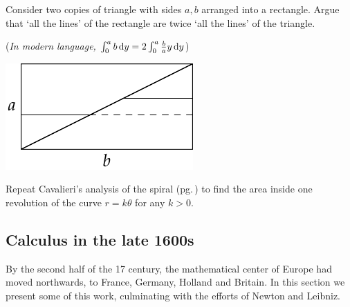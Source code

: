 \begin{exercises}{}{}
\begin{enumerate}
		\begin{minipage}[t]{0.6\linewidth}\vspace{0pt}
			\item Consider two copies of triangle with sides $a,b$ arranged into a rectangle. Argue that `all the lines' of the rectangle are twice `all the lines' of the triangle.\par
			(\emph{In modern language, $\int_0^ab\,{\mathrm{d} y}=2\int_0^a\frac bay\,{\mathrm{d} y}$}) 
		\end{minipage}
		\hfill
		\begin{minipage}[t]{0.39\linewidth}\vspace{0pt}
			\flushright\includegraphics{analytic-torri3}
		\end{minipage}\par
		
		\item Repeat Cavalieri's analysis of the spiral (pg.\,\pageref{pg:cavspiral}) to find the area inside one revolution of the curve $r=k\theta$ for any $k>0$.
		
	\end{enumerate}
\end{exercises}


\clearpage




\subsection{Calculus in the late 1600s}

By the second half of the 17\th{} century, the mathematical center of Europe had moved northwards, to France, Germany, Holland and Britain. In this section we present some of this work, culminating with the efforts of Newton and Leibniz.\par

